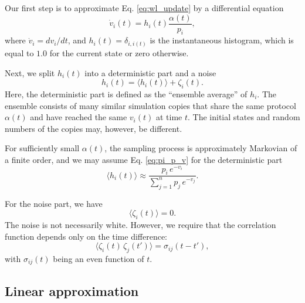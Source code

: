 \documentclass[reprint]{revtex4-1}
\begin{document}
Our first step is to approximate Eq. \eqref{eq:wl_update}
by a differential equation
%
\begin{equation}
  \dot v_i(t)
  =
  h_i(t) \frac{ \alpha(t) } { p_i },
  \label{eq:vt_diffeq}
\end{equation}
%
where
$\dot v_i = dv_i/dt$,
%
and $h_i(t) = \delta_{i, i(t)}$
is the instantaneous histogram,
which is equal to $1.0$
for the current state
or zero otherwise.



Next, we split $h_i(t)$ into a deterministic part
and a noise
%
\begin{equation}
  h_i(t) = \langle h_i(t) \rangle + \zeta_i(t).
  \label{eq:h_split}
\end{equation}
%
Here, the deterministic part is defined
as the ``ensemble average'' of $h_i$.
%
The ensemble consists of many similar simulation copies
that share the same protocol $\alpha(t)$
and have reached the same $v_i(t)$
at time $t$.
%
The initial states and random numbers of the copies
may, however, be different.



For sufficiently small $\alpha(t)$,
the sampling process is approximately
Markovian of a finite order,
and we may assume Eq. \eqref{eq:pi_p_v}
for the deterministic part
%
\begin{equation}
  \langle h_i(t) \rangle
  \approx
  \frac{ p_i \, e^{-v_i} }
  { \sum_{j = 1}^n p_j \, e^{-v_j} }.
  \label{eq:h_ave}
\end{equation}



For the noise part, we have
%
\begin{equation}
  \langle \zeta_i(t) \rangle = 0.
  \label{eq:zeta_zeromean}
\end{equation}
%
The noise is not necessarily white.
However, we require that the correlation
function depends only on the time difference:
%
\begin{equation}
  \langle \zeta_i(t) \, \zeta_j(t') \rangle
  =
  \sigma_{ij}(t - t'),
  \label{eq:zeta_zeta_correlation}
\end{equation}
%
with $\sigma_{ij}(t)$ being an even function of $t$.



\subsection{Linear approximation}
\end{document}
